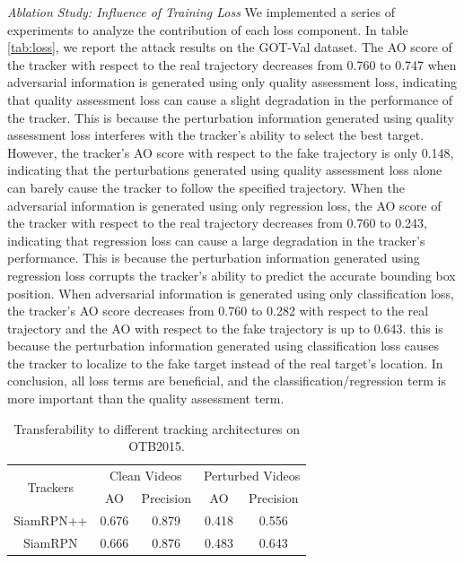 \documentclass[journal]{IEEEtran}
\begin{document}
\textit{Ablation Study: Influence of Training Loss} We implemented a series of experiments to analyze the contribution of each loss component. In table \ref{tab:loss}, we report the attack results on the GOT-Val dataset. The AO score of the tracker with respect to the real trajectory decreases from 0.760 to 0.747 when adversarial information is generated using only quality assessment loss, indicating that quality assessment loss can cause a slight degradation in the performance of the tracker. This is because the perturbation information generated using quality assessment loss interferes with the tracker's ability to select the best target. However, the tracker's AO score with respect to the fake trajectory is only 0.148, indicating that the perturbations generated using quality assessment loss alone can barely cause the tracker to follow the specified trajectory. When the adversarial information is generated using only regression loss, the AO score of the tracker with respect to the real trajectory decreases from 0.760 to 0.243, indicating that regression loss can cause a large degradation in the tracker's performance. This is because the perturbation information generated using regression loss corrupts the tracker's ability to predict the accurate bounding box position. When adversarial information is generated using only classification loss, the tracker's AO score decreases from 0.760 to 0.282 with respect to the real trajectory and the AO with respect to the fake trajectory is up to 0.643. this is because the perturbation information generated using classification loss causes the tracker to localize to the fake target instead of the real target's location. In conclusion, all loss terms are beneficial, and the classification/regression term is more important than the quality assessment term.

\begin{table}
  \centering
  \caption{Transferability to different tracking architectures on OTB2015.}
  \begin{tabular}{c|cc|cc} 
  \toprule
  \multirow{2}{*}[-2pt]{Trackers} & \multicolumn{2}{c|}{Clean Videos} & \multicolumn{2}{c}{Perturbed Videos}  \\
  \cmidrule{2-5}
                            & AO & Precision              & AO & Precision                   \\
  \midrule
  SiamRPN++                 & 0.676   & 0.879                  & 0.418   & 0.556                       \\
  SiamRPN                   & 0.666   & 0.876                  & 0.483   & 0.643                       \\
  \bottomrule
  \end{tabular}
  \label{tab:arch}
\end{table}
\end{document}
